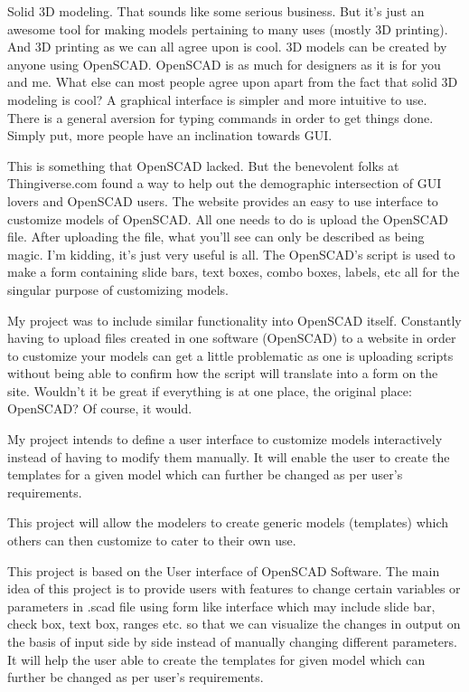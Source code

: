\documentclass[12pt]{report}
\begin{document}
Solid 3D modeling. That sounds like some serious business. But it’s just an awesome tool for making models pertaining to many uses (mostly 3D printing). And 3D printing as we can all agree upon is cool. 3D models can be created by anyone using OpenSCAD. OpenSCAD is as much for designers as it is for you and me. What else can most people agree upon apart from the fact that solid 3D modeling is cool? A graphical interface is simpler and more intuitive to use. There is a general aversion for typing commands in order to get things done. Simply put, more people have an inclination towards GUI.

This is something that OpenSCAD lacked. But the benevolent folks at Thingiverse.com found a way to help out the demographic intersection of GUI lovers and OpenSCAD users. The website provides an easy to use interface to customize models of OpenSCAD. All one needs to do is upload the OpenSCAD file. After uploading the file, what you’ll see can only be described as being magic. I’m kidding, it’s just very useful is all. The OpenSCAD’s script is used to make a form containing slide bars, text boxes, combo boxes, labels, etc all for the singular purpose of customizing models.

My project was to include similar functionality into OpenSCAD itself. Constantly having to upload files created in one software (OpenSCAD) to a website in order to customize your models can get a little problematic as one is uploading scripts without being able to confirm how the script will translate into a form on the site. Wouldn’t it be great if everything is at one place, the original place: OpenSCAD? Of course, it would.

My project intends to define a user interface to customize models interactively instead of having to modify them manually. It will enable the user to create the templates for a given model which can further be changed as per user’s requirements.

This project will allow the modelers to create generic models (templates) which others can then customize to cater to their own use.

This project is based on the User interface of OpenSCAD Software. The main idea of this project is to provide users with features to change certain variables or parameters in .scad file using form like interface which may include slide bar, check box, text box, ranges etc. so that we can visualize the changes in output on the basis of input side by side instead of manually changing different parameters. It will help the user able to create the templates for given model which can further be changed as per user's requirements.
\end{document}
